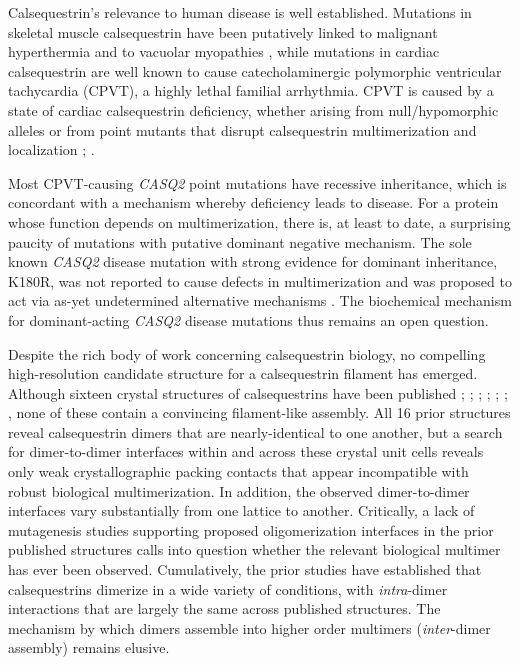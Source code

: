 Calsequestrin's relevance to human disease is well established. Mutations in skeletal muscle calsequestrin have been putatively linked to malignant hyperthermia and to vacuolar myopathies \cite{Lewis2015-zv}, while mutations in cardiac calsequestrin are well known to cause catecholaminergic polymorphic ventricular tachycardia (CPVT), a highly lethal familial arrhythmia. CPVT is caused by a state of cardiac calsequestrin deficiency, whether arising from null/hypomorphic alleles or from point mutants that disrupt calsequestrin multimerization and localization \cite{Bal2010-vf}; \cite{Bal2011-tv}. 
\begin{hlbreakable}
Most CPVT-causing \textit{CASQ2} point mutations have recessive inheritance, which is concordant with a mechanism whereby deficiency leads to disease. For a protein whose function depends on multimerization, there is, at least to date, a surprising paucity of mutations with putative dominant negative mechanism. The sole known \textit{CASQ2} disease mutation with strong evidence for dominant inheritance, K180R, was not reported to cause defects in multimerization and was proposed to act via as-yet undetermined alternative mechanisms \cite{Gray2016-kx}. The biochemical mechanism for dominant-acting \textit{CASQ2} disease mutations thus remains an open question.
\end{hlbreakable}

Despite the rich body of work concerning calsequestrin biology, no compelling high-resolution candidate structure for a calsequestrin filament has emerged. Although sixteen crystal structures of calsequestrins have been published \cite{Wang1998-cm}; \cite{Park2004-bu}; \cite{Kim2007-sj}; \cite{Sanchez2012-yl}; \cite{Sanchez2012-qi}; \cite{Lewis2015-zv}; \cite{Lewis2016-am}, none of these contain a convincing filament-like assembly. All 16 prior structures reveal calsequestrin dimers that are nearly-identical to one another, but a search for dimer-to-dimer interfaces within and across these crystal unit cells reveals only weak crystallographic packing contacts that appear incompatible with robust biological multimerization. In addition, the observed dimer-to-dimer interfaces vary substantially from one lattice to another. Critically, a lack of mutagenesis studies supporting proposed oligomerization interfaces in the prior published structures calls into question whether the relevant biological multimer has ever been observed. Cumulatively, the prior studies have established that calsequestrins dimerize in a wide variety of conditions, with \textit{intra}-dimer interactions that are largely the same across published structures. The mechanism by which dimers assemble into higher order multimers (\textit{inter}-dimer assembly) remains elusive.

